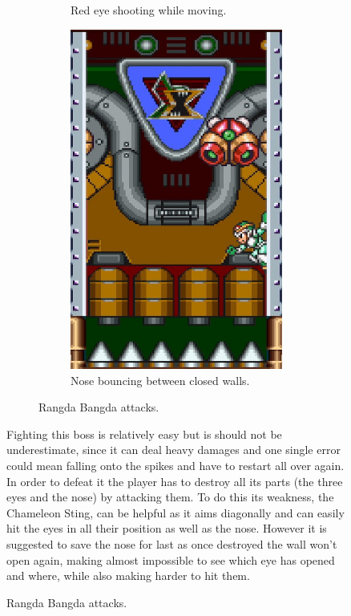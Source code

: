 \begin{figure}[htp]
\begin{figure}[htp]
\begin{subfigure}{0.40\linewidth}
		\caption{Red eye shooting while moving.}
	\end{subfigure}
	\hfil
	\begin{subfigure}{0.30\linewidth}
		\centering
		\includegraphics[width=\linewidth]{figures/X1/Sigma_stages/Rangda_nose.jpg}
		\caption{Nose bouncing between closed walls.}
	\end{subfigure}
	\caption{Rangda Bangda attacks.}
\end{figure} 

Fighting this boss is relatively easy but is should not be underestimate, since it can deal heavy damages and one single error could mean falling onto the spikes and have to restart all over again. In order to defeat it the player has to destroy all its parts (the three eyes and the nose)  by attacking them. To do this its weakness, the Chameleon Sting, can be helpful as it aims diagonally and can easily hit the eyes in all their position as well as the nose. However it is suggested to save the nose for last as once destroyed the wall won't open again, making almost impossible to see which eye has opened and where, while also making harder to hit them.


\end{figure}
